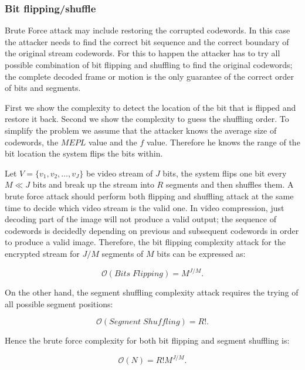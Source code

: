 \documentclass[preprint]{elsarticle}
\begin{document}
\subsubsection{Bit flipping/shuffle}

Brute Force attack may include restoring the corrupted codewords. In this case the attacker needs to find the correct bit sequence and the correct boundary of the original stream codewords. For this to happen the attacker has to try all possible combination of bit flipping and shuffling to find the original codewords; the complete decoded frame or motion is the only guarantee of the correct order of bits and segments.

First we show the complexity to detect the location of the bit that is flipped and restore it back. Second we show the complexity to guess the shuffling order. To simplify the problem we assume that the attacker knows the average size of codewords, the $MEPL$ value and the $f$ value. Therefore he knows the range of the bit location the system flips the bits within. 

Let $V=\{v_{1},v_{2}, \ldots ,v_{J}\}$ be video stream of $J$ bits, the system flips one bit every $M \ll J$ bits and break up the stream into $R$ segments and then shuffles them. A brute force attack should perform both flipping and shuffling attack at the same time to decide which video stream is the valid one. In video compression, just decoding part of the image will not produce a valid output; the sequence of codewords is decidedly depending on previous and subsequent codewords in order to produce a valid image. Therefore, the bit flipping complexity attack for the encrypted stream for $J/M$ segments of $M$ bits can be expressed as:

\begin{equation}
\mathcal{O}(Bits \; Flipping) = M^{J/M}.
\label{ec10}
\end{equation}

On the other hand, the segment shuffling complexity attack requires the trying of all possible segment positions:

\begin{equation}
\mathcal{O}(Segment \; Shuffling) = R!.
\label{ec11}
\end{equation}

Hence the brute force complexity for both bit flipping and segment shuffling is:

\begin{equation}
\mathcal{O}(N) = R!M^{J/M}.
\label{ec12}
\end{equation}
\end{document}
